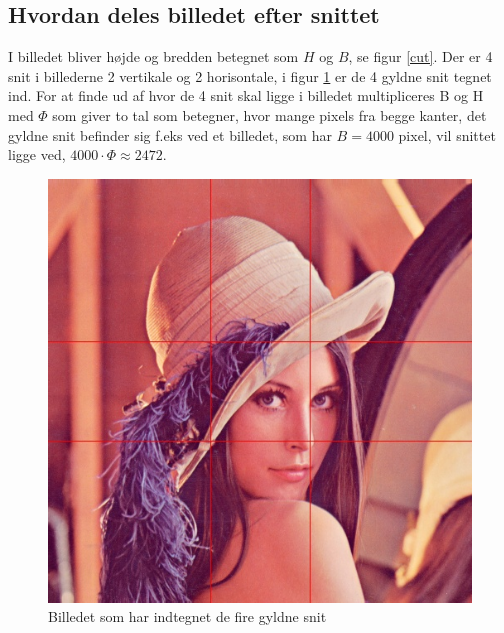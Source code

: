 \subsection{Hvordan deles billedet efter snittet}

I billedet bliver højde og bredden betegnet som $H$ og $B$, se figur
\ref{cut}. Der er 4 snit i billederne 2 vertikale og 2 horisontale, i
figur \ref{lenasnit2} er de 4 gyldne snit tegnet ind. For at finde ud af hvor
de 4 snit skal ligge i billedet multipliceres B og H med $\varPhi$ som
giver to tal som betegner, hvor mange pixels fra begge kanter, det
gyldne snit befinder sig f.eks ved et billedet, som har $B = 4000$ pixel,
vil snittet ligge ved, $4000 \cdot \varPhi \approx 2472$.

\begin{figure}[h]
	\begin{center}
		\includegraphics[scale=0.42,angle=0]{afsnit/vores_implementation/billeder/naiv_algoritme/Lenagolden}
	\end{center}
	\caption[]{Billedet som har indtegnet de fire gyldne snit}
	\label{lenasnit2}
\end{figure}

